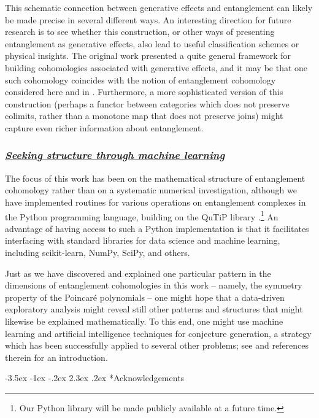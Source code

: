 \documentclass[12pt]{article}
\makeatletter
\newcommand{\ul}[1]{{\underline{#1}}}
\renewcommand\section{\@startsection {section}{1}{\z@}%
                                   {-3.5ex \@plus -1ex \@minus -.2ex}%
                                   {2.3ex \@plus.2ex}%
                                   {\normalfont\large\bfseries}}
\numberwithin{equation}{section}
\makeatother
\begin{document}
This schematic connection between generative effects and entanglement can likely be made precise in several different ways. An interesting direction for future research is to see whether this construction, or other ways of presenting entanglement as generative effects, also lead to useful classification schemes or physical insights. The original work \cite{Adam2017SystemsGA} presented a quite general framework for building cohomologies associated with generative effects, and it may be that one such cohomology coincides with the notion of entanglement cohomology considered here and in \cite{Mainiero:2019enr}. Furthermore, a more sophisticated version of this construction (perhaps a functor between categories which does not preserve colimits, rather than a monotone map that does not preserve joins) might capture even richer information about entanglement.



\subsubsection*{\ul{\it Seeking structure through machine learning}}

The focus of this work has been on the mathematical structure of entanglement cohomology rather than on a systematic numerical investigation, although we have implemented routines for various operations on entanglement complexes in the Python programming language, building on the QuTiP library \cite{Johansson:2011jer,Johansson:2012qtx}.\footnote{Our Python library will be made publicly available at a future time.} An advantage of having access to such a Python implementation is that it facilitates interfacing with standard libraries for data science and machine learning, including scikit-learn, NumPy, SciPy, and others.

Just as we have discovered and explained one particular pattern in the dimensions of entanglement cohomologies in this work -- namely, the symmetry property of the Poincar\'e polynomials -- one might hope that a data-driven exploratory analysis might reveal still other patterns and structures that might likewise be explained mathematically. To this end, one might use machine learning and artificial intelligence techniques for conjecture generation, a strategy which has been successfully applied to several other problems; see \cite{Gukov:2024buj} and references therein for an introduction.


\section*{Acknowledgements}
\end{document}
